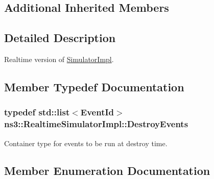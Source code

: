 \subsection*{Additional Inherited Members}


\subsection{Detailed Description}
Realtime version of \hyperlink{classns3_1_1SimulatorImpl}{Simulator\+Impl}. 

\subsection{Member Typedef Documentation}
\subsubsection[{\texorpdfstring{Destroy\+Events}{DestroyEvents}}]{\setlength{\rightskip}{0pt plus 5cm}typedef {\bf std\+::list}$<${\bf Event\+Id}$>$ {\bf ns3\+::\+Realtime\+Simulator\+Impl\+::\+Destroy\+Events}\hspace{0.3cm}{\ttfamily [private]}}\hypertarget{classns3_1_1RealtimeSimulatorImpl_aece9db06c7b61b8d95fe54ac2c7b9108}{}\label{classns3_1_1RealtimeSimulatorImpl_aece9db06c7b61b8d95fe54ac2c7b9108}
Container type for events to be run at destroy time. 

\subsection{Member Enumeration Documentation}
